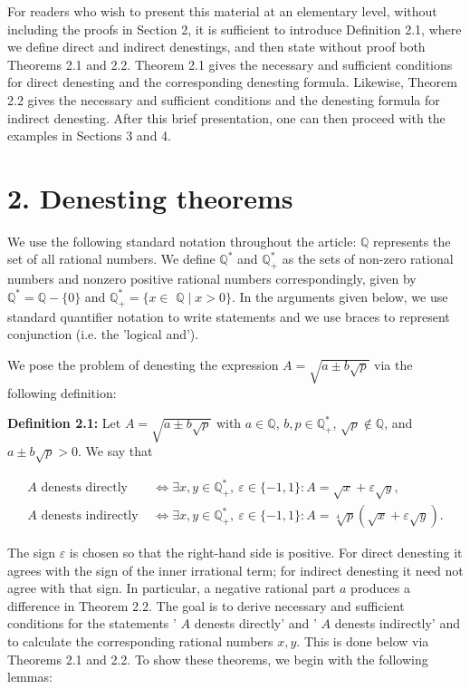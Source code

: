 \documentclass[11pt,letterpaper]{article}
\begin{document}
For readers who wish to present this material at an elementary level, without including the proofs in Section 2, it is sufficient to introduce Definition 2.1, where we define direct and indirect denestings, and then state without proof both Theorems 2.1 and 2.2. Theorem 2.1 gives the necessary and sufficient conditions for direct denesting and the corresponding denesting formula. Likewise, Theorem 2.2 gives the necessary and sufficient conditions and the denesting formula for indirect denesting. After this brief presentation, one can then proceed with the examples in Sections 3 and 4.

\section*{2. Denesting theorems}
We use the following standard notation throughout the article: $\mathbb{Q}$ represents the set of all rational numbers. We define $\mathbb{Q}^{*}$ and $\mathbb{Q}_{+}^{*}$ as the sets of non-zero rational numbers and nonzero positive rational numbers correspondingly, given by $\mathbb{Q}^{*}=\mathbb{Q}-\{0\}$ and $\mathbb{Q}_{+}^{*}=\{x \in$ $\mathbb{Q} \mid x>0\}$. In the arguments given below, we use standard quantifier notation to write statements and we use braces to represent conjunction (i.e. the 'logical and').

We pose the problem of denesting the expression $A=\sqrt{a \pm b \sqrt{p}}$ via the following definition:

\noindent\textbf{Definition 2.1:} Let $A=\sqrt{a\pm b\sqrt p}$ with $a\in\mathbb Q$, $b,p\in\mathbb Q_+^*$, $\sqrt p\notin\mathbb Q$, and $a\pm b\sqrt p>0$. We say that

\[
\begin{aligned}
A \text { denests directly } & \Longleftrightarrow \exists x,y\in\mathbb Q_+^*,\ \varepsilon\in\{-1,1\}: A=\sqrt{x}+\varepsilon\sqrt{y}, \\
A \text { denests indirectly } & \Longleftrightarrow \exists x,y\in\mathbb Q_+^*,\ \varepsilon\in\{-1,1\}: A=\sqrt[4]{p}(\sqrt{x}+\varepsilon\sqrt{y}) .
\end{aligned}
\]

The sign $\varepsilon$ is chosen so that the right-hand side is positive. For direct denesting it agrees with the sign of the inner irrational term; for indirect denesting it need not agree with that sign. In particular, a negative rational part $a$ produces a difference in Theorem 2.2. The goal is to derive necessary and sufficient conditions for the statements ' $A$ denests directly' and ' $A$ denests indirectly' and to calculate the corresponding rational numbers $x, y$. This is done below via Theorems 2.1 and 2.2. To show these theorems, we begin with the following lemmas:
\end{document}
